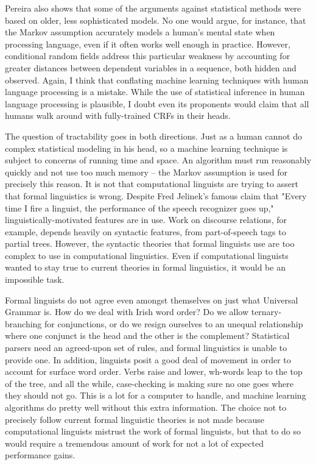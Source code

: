 \documentclass[paper=a4, fontsize=11pt]{scrartcl} %
\begin{document}
Pereira also shows that some of the arguments against statistical methods were based on older, less sophisticated models.  No one would argue, for instance, that the Markov assumption accurately models a human's mental state when processing language, even if it often works well enough in practice.  However, conditional random fields address this particular weakness by accounting for greater distances between dependent variables in a sequence, both hidden and observed.  Again, I think that conflating machine learning techniques with human language processing is a mistake.  While the use of statistical inference in human language processing is plausible, I doubt even its proponents would claim that all humans walk around with fully-trained CRFs in their heads.  

The question of tractability goes in both directions.  Just as a human cannot do complex statistical modeling in his head, so a machine learning technique is subject to concerns of running time and space.  An algorithm must run reasonably quickly and not use too much memory -- the Markov assumption is used for precisely this reason.  It is not that computational linguists are trying to assert that formal linguistics is wrong.  Despite Fred Jelinek's famous claim that "Every time I fire a linguist, the performance of the speech recognizer goes up," linguistically-motivated features are in use.  Work on discourse relations, for example, depends heavily on syntactic features, from part-of-speech tags to partial trees.  However, the syntactic theories that formal linguists use are too complex to use in computational linguistics.  Even if computational linguists wanted to stay true to current theories in formal linguistics, it would be an impossible task.  

Formal linguists do not agree even amongst themselves on just what Universal Grammar is.  How do we deal with Irish word order?  Do we allow ternary-branching for conjunctions, or do we resign ourselves to an unequal relationship where one conjunct is the head and the other is the complement?  Statistical parsers need an agreed-upon set of rules, and formal linguistics is unable to provide one.  In addition, linguists posit a good deal of movement in order to account for surface word order.  Verbs raise and lower, wh-words leap to the top of the tree, and all the while, case-checking is making sure no one goes where they should not go.  This is a lot for a computer to handle, and machine learning algorithms do pretty well without this extra information.  The choice not to precisely follow current formal linguistic theories is not made because computational linguists mistrust the work of formal linguists, but that to do so would require a tremendous amount of work for not a lot of expected performance gains.  
\end{document}
